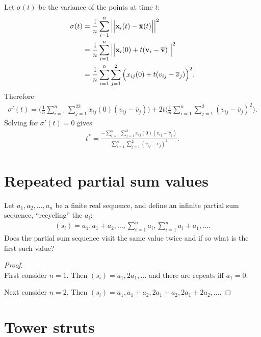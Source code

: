 \documentclass[12pt]{article}
\begin{document}
Let $\sigma(t)$ be the variance of the points at time $t$:
\begin{align*}
  \sigma(t) &= \frac{1}{n}\sum_{i=1}^n\Big|\Big|\mathbf x_i(t) - \overline {\mathbf x}(t)\Big|\Big|^2\\
            &= \frac{1}{n}\sum_{i=1}^n\Big|\Big|\mathbf x_i(0) + t(\mathbf v_i - \overline {\mathbf v})\Big|\Big|^2\\
            &= \frac{1}{n}\sum_{i=1}^n\sum_{j=1}^2\Big(x_{ij}(0) + t(v_{ij} - \overline v_j)\Big)^2.
\end{align*}
Therefore
\begin{align*}
  \sigma'(t) = \Bigg(\frac{1}{n}\sum_{i=1}^n\sum_{j=1}^22x_{ij}(0)(v_{ij} - \bar v_j)\Bigg) +
              2t\Bigg(\frac{1}{n}\sum_{i=1}^n\sum_{j=1}^2(v_{ij} - \bar v_j)^2\Bigg).
\end{align*}
Solving for $\sigma'(t) = 0$ gives
\begin{align*}
  t^* = \frac{-\sum_{i=1}^n\sum_{j=1}^2x_{ij}(0)(v_{ij} - \bar v_j)}
             {\sum_{i=1}^n\sum_{j=1}^2(v_{ij} - \bar v_j)^2}.
\end{align*}

\section{Repeated partial sum values}

\begin{mdframed}
  Let $a_1, a_2, \ldots, a_n$ be a finite real sequence, and define an infinite partial sum
  sequence, ``recycling'' the $a_i$:
  \begin{align*}
    (s_i) = a_1, a_1 + a_2, \ldots, \sum_{i=1}^na_i, \sum_{i=1}^na_i + a_1, \ldots.
  \end{align*}
  Does the partial sum sequence visit the same value twice and if so what is the first such value?
\end{mdframed}


\begin{proof}~\\
  First consider $n = 1$. Then $(s_i) = a_1, 2a_1, \ldots$ and there are repeats iff $a_1 = 0$.

  Next consider $n = 2$. Then $(s_i) = a_1, a_1 + a_2, 2a_1 + a_2, 2a_1 + 2a_2, \ldots$.
\end{proof}
\section{Tower struts}
\end{document}
